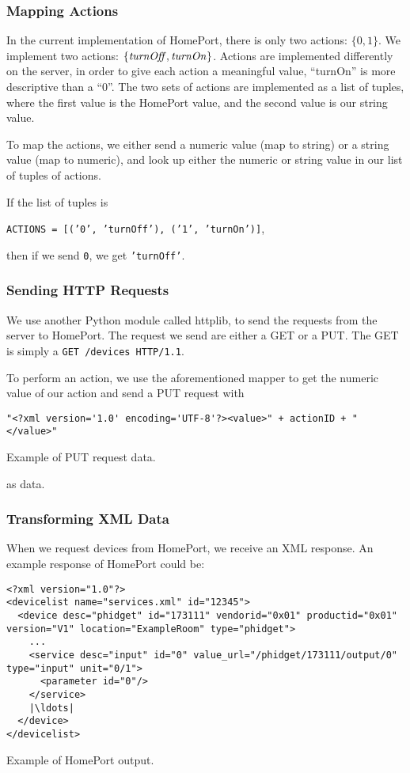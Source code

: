 \subsubsection{Mapping Actions}
In the current implementation of HomePort, 
there is only two actions: $\{0, 1\}$.
We implement two actions: $\{\var{turnOff}, \var{turnOn}\}$. 
Actions are implemented differently on the server, 
in order to give each action a meaningful value, 
\eg ``turnOn'' is more descriptive than a ``0''.
The two sets of actions are implemented as a list of tuples, 
where the first value is the HomePort value, 
and the second value is our string value. 

To map the actions, we either send a numeric value (map to string) or a string value (map to numeric), 
and look up either the numeric or string value in our list of tuples of actions.

If the list of tuples is
\begin{center}
  \texttt{ACTIONS = [('0', 'turnOff'), ('1', 'turnOn')]},
\end{center}
then if we send \texttt{0}, we get \texttt{'turnOff'}. 

\subsubsection{Sending HTTP Requests}
We use another Python module called httplib, 
to send the requests from the server to HomePort. 
The request we send are either a GET or a PUT. 
The GET is simply a \texttt{GET /devices HTTP/1.1}. 

To perform an action, we use the aforementioned mapper to get the numeric value of our action and send a PUT request with 
\begin{listing}
\begin{verbatim}
"<?xml version='1.0' encoding='UTF-8'?><value>" + actionID + "</value>"
\end{verbatim}
\caption{Example of PUT request data.}
\label{lst:putrequest}
\end{listing}
as data. 

\subsubsection{Transforming XML Data}
When we request devices from HomePort, 
we receive an XML response. 
An example response of HomePort could be:
\begin{listing}
\begin{verbatim}
<?xml version="1.0"?>
<devicelist name="services.xml" id="12345">
  <device desc="phidget" id="173111" vendorid="0x01" productid="0x01" version="V1" location="ExampleRoom" type="phidget">
    ...
    <service desc="input" id="0" value_url="/phidget/173111/output/0" type="input" unit="0/1">
      <parameter id="0"/>
    </service>
    |\ldots|
  </device>
</devicelist>
\end{verbatim}

\caption{Example of HomePort output.}
\label{lst:homeportoutput}
\end{listing}

